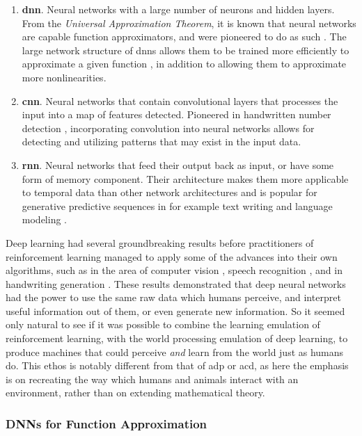 \documentclass[../report.tex]{subfiles}
\begin{document}
\begin{enumerate}
    \item \textbf{\ac{dnn}}. Neural networks with a large number of neurons and hidden layers. From the \textit{Universal Approximation Theorem}, it is known that neural networks are capable function approximators, and were pioneered to do as such \cite{dnn_pioneer_for_function_approximation}. The large network structure of \acp{dnn} allows them to be trained more efficiently to approximate a given function \cite{Liang2016WhyDN}, in addition to allowing them to approximate more nonlinearities.
    \item \textbf{\ac{cnn}}. Neural networks that contain convolutional layers that processes the input into a map of features detected. Pioneered in handwritten number detection \cite{cnn_og}, incorporating convolution into neural networks allows for detecting and utilizing patterns that may exist in the input data.
    \item \textbf{\ac{rnn}}. Neural networks that feed their output back as input, or have some form of memory component. Their architecture makes them more applicable to temporal data than other network architectures and is popular for generative predictive sequences in for example text writing \cite{rnn_4_writing} and language modeling \cite{rnn_4_language}.
\end{enumerate}

Deep learning had several groundbreaking results before practitioners of reinforcement learning managed to apply some of the advances into their own algorithms, such as in the area of computer vision \cite{dnn_b4_drl_1_image_recognition, dnn_b4_drl_2_image_recognition}, speech recognition \cite{dnn_b4_drl_1_speech_recognition, dnn_b4_drl_2_speech_recognition}, and in handwriting generation \cite{rnn_4_writing}. These results demonstrated that deep neural networks had the power to use the same raw data which humans perceive, and interpret useful information out of them, or even generate new information. So it seemed only natural to see if it was possible to combine the learning emulation of reinforcement learning, with the world processing emulation of deep learning, to produce machines that could perceive \textit{and} learn from the world just as humans do. This ethos is notably different from that of \ac{adp} or \ac{acd}, as here the emphasis is on recreating the way which humans and animals interact with an environment, rather than on extending mathematical theory.

\subsubsection{DNNs for Function Approximation}
\end{document}
